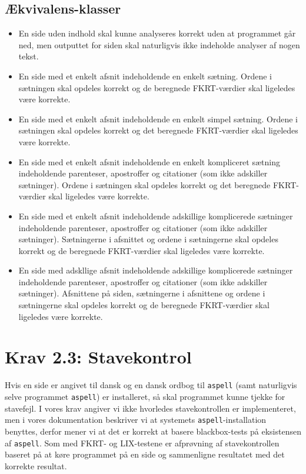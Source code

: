 \documentclass[a4paper,oneside,article, titlepage]{memoir}
\begin{document}
\subsection{Ækvivalens-klasser}
\begin{itemize}
\item En side uden indhold skal kunne analyseres korrekt uden at
  programmet går ned, men outputtet for siden skal naturligvis ikke
  indeholde analyser af nogen tekst.
\item En side med et enkelt afsnit indeholdende en enkelt
  sætning. Ordene i sætningen skal opdeles korrekt og de beregnede
  FKRT-værdier skal ligeledes være korrekte.
\item En side med et enkelt afsnit indeholdende en enkelt simpel
  sætning. Ordene i sætningen skal opdeles korrekt og det beregnede
  FKRT-værdier skal ligeledes være korrekte.
\item En side med et enkelt afsnit indeholdende en enkelt kompliceret
  sætning indeholdende parenteser, apostroffer og citationer (som ikke
  adskiller sætninger). Ordene i sætningen skal opdeles korrekt og det
  beregnede FKRT-værdier skal ligeledes være korrekte.
\item En side med et enkelt afsnit indeholdende adskillige
  komplicerede sætninger indeholdende parenteser, apostroffer og
  citationer (som ikke adskiller sætninger). Sætningerne i afsnittet
  og ordene i sætningerne skal opdeles korrekt og de beregnede
  FKRT-værdier skal ligeledes være korrekte.
\item En side med adskllige afsnit indeholdende adskillige
  komplicerede sætninger indeholdende parenteser, apostroffer og
  citationer (som ikke adskiller sætninger). Afsnittene på siden,
  sætningerne i afsnittene og ordene i sætningerne skal opdeles
  korrekt og de beregnede FKRT-værdier skal ligeledes være korrekte.
\end{itemize}

\section*{Krav 2.3: Stavekontrol}

Hvis en side er angivet til dansk og en dansk ordbog til
\texttt{aspell} (samt naturligvis selve programmet \texttt{aspell}) er
installeret, så skal programmet kunne tjekke for stavefejl. I vores
krav angiver vi ikke hvorledes stavekontrollen er implementeret, men i
vores dokumentation beskriver vi at systemets
\texttt{aspell}-installation benyttes, derfor mener vi at det er
korrekt at basere blackbox-tests på eksistensen af
\texttt{aspell}. Som med FKRT- og LIX-testene er afprøvning af
stavekontrollen baseret på at køre programmet på en side og
sammenligne resultatet med det korrekte resultat.
\end{document}
